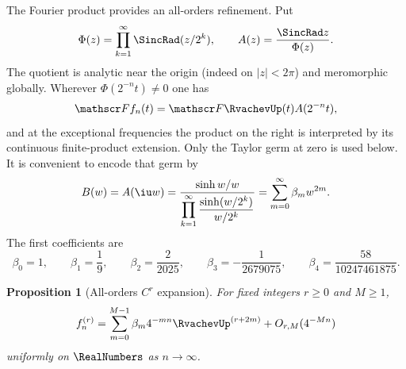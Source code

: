 \documentclass[11pt,oneside]{article}
\newtheorem{proposition}[proposition]{Proposition}
\theoremstyle{definition}
\theoremstyle{remark}
\begin{document}
The Fourier product provides an all-orders refinement.  Put
\begin{equation}
 \Phi(z)=\prod_{k=1}^{\infty}\SincRad(z/2^k),
 \qquad
 A(z)=\frac{\SincRad z}{\Phi(z)}.
 \label{repeated2:eq:A-ratio}
\end{equation}
The quotient is analytic near the origin (indeed on $|z|<2\pi$) and meromorphic
globally.  Wherever $\Phi(2^{-n}t)\ne0$ one has
\begin{equation}
 \mathscr F f_n(t)=\mathscr F\RvachevUp(t)A(2^{-n}t),
 \label{repeated2:eq:fourier-ratio}
\end{equation}
and at the exceptional frequencies the product on the right is interpreted by its
continuous finite-product extension.  Only the Taylor germ at zero is used below.  It is
convenient to encode that germ by
\begin{equation}
 B(w)=A(\iu w)
 =\frac{\sinh w/w}{\displaystyle\prod_{k=1}^{\infty}
 \frac{\sinh(w/2^k)}{w/2^k}}
 =\sum_{m=0}^{\infty}\beta_mw^{2m}.
 \label{repeated2:eq:B-generating}
\end{equation}
The first coefficients are
\begin{equation}
 \beta_0=1,
 \qquad \beta_1=\frac19,
 \qquad \beta_2=\frac{2}{2025},
 \qquad \beta_3=-\frac1{2679075},
 \qquad \beta_4=\frac{58}{10247461875}.
 \label{repeated2:eq:beta-first}
\end{equation}

\begin{proposition}[All-orders $C^r$ expansion]
\label{repeated2:prop:all-orders-expansion}
For fixed integers $r\ge0$ and $M\ge1$,
\begin{equation}
 f_n^{(r)}
 =\sum_{m=0}^{M-1}\beta_m4^{-mn}\RvachevUp^{(r+2m)}
 +O_{r,M}(4^{-Mn})
 \label{repeated2:eq:all-orders-expansion}
\end{equation}
uniformly on $\RealNumbers$ as $n\to\infty$.
\end{proposition}
\end{document}

